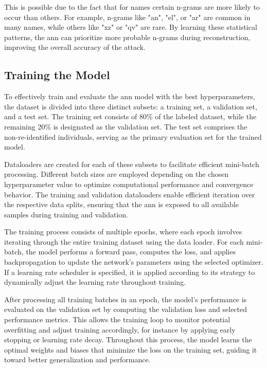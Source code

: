 This is possible due to the fact that for names certain n-grams are more likely to occur than others. For example, n-grams like "an", "el", or "ar" are common in many names, while others like "xz" or "qv" are rare. By learning these statistical patterns, the \ac{ann} can prioritize more probable n-grams during reconstruction, improving the overall accuracy of the attack.

\subsection{Training the Model} \label{sec:training}

To effectively train and evaluate the \ac{ann} model with the best hyperparameters, the dataset is divided into three distinct subsets: a training set, a validation set, and a test set.
The training set consists of 80\% of the labeled dataset, while the remaining 20\% is designated as the validation set.
The test set comprises the non-re-identified individuals, serving as the primary evaluation set for the trained model.

Dataloaders are created for each of these subsets to facilitate efficient mini-batch processing.
Different batch sizes are employed depending on the chosen hyperparameter value to optimize computational performance and convergence behavior.
The training and validation dataloaders enable efficient iteration over the respective data splits, ensuring that the \ac{ann} is exposed to all available samples during training and validation.

The training process consists of multiple epochs, where each epoch involves iterating through the entire training dataset using the data loader.
For each mini-batch, the model performs a forward pass, computes the loss, and applies backpropagation to update the network’s parameters using the selected optimizer.
If a learning rate scheduler is specified, it is applied according to its strategy to dynamically adjust the learning rate throughout training.

After processing all training batches in an epoch, the model’s performance is evaluated on the validation set by computing the validation loss and selected performance metrics.
This allows the training loop to monitor potential overfitting and adjust training accordingly, for instance by applying early stopping or learning rate decay.
Throughout this process, the model learns the optimal weights and biases that minimize the loss on the training set, guiding it toward better generalization and performance.

